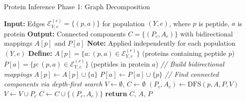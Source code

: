 \documentclass[pdflatex,sn-nature]{sn-jnl}
\begin{document}
\begin{algorithm}[H]
\caption{Protein Inference Phase 1: Graph Decomposition}
\begin{algorithmic}[1]
\State \textbf{Input:} Edges $\mathcal{E}^{(r)}_{Y,e} = \{(p, a)\}$ for population $(Y, e)$, where $p$ is peptide, $a$ is protein
\State \textbf{Output:} Connected components $C = \{(P_c, A_c)\}$ with bidirectional mappings $A[p]$ and $P[a]$
\State \textbf{Note:} Applied independently for each population $(Y, e)$
\State \textbf{Define:} $A[p] = \{a : (p, a) \in \mathcal{E}^{(r)}_{Y,e}\}$ (proteins containing peptide $p$)
\State \hspace{2.3em} $P[a] = \{p : (p, a) \in \mathcal{E}^{(r)}_{Y,e}\}$ (peptides in protein $a$)
\State
\State \textit{// Build bidirectional mappings}
    \State $A[p] \gets A[p] \cup \{a\}$ 
    \State $P[a] \gets P[a] \cup \{p\}$ 
\EndFor
\State
\State \textit{// Find connected components via depth-first search}
\State $V \gets \emptyset$, $C \gets \emptyset$ 
        \State $(P_c, A_c) \gets \text{DFS}(p, A, P, V)$ 
        \State $V \gets V \cup P_c$ 
        \State $C \gets C \cup \{(P_c, A_c)\}$
    \EndIf
\EndFor
\State
\State \textbf{return} $C$, $A$, $P$
\end{algorithmic}
\end{algorithm}
\end{document}
